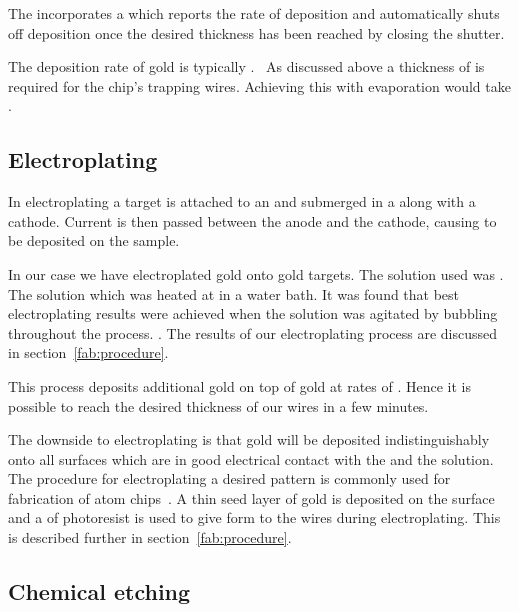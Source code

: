 The  incorporates a  which reports the rate of
deposition and automatically shuts off deposition once the desired thickness
has been reached by closing the shutter. 

The deposition rate of gold is typically .~\cite{} As discussed above 
a thickness of  is required for the chip's trapping wires. Achieving
this with evaporation would take . 

\subsection{Electroplating}

In electroplating a target is attached to an  and submerged in a
 along with a cathode. Current is then passed between
the anode and the cathode, causing  to be deposited on
the sample. 


In our case we have electroplated gold onto gold targets. The solution used was
. The solution which was heated at
 in a water bath. It was found that best electroplating results were
achieved when the solution was agitated by bubbling throughout the process.
.  The results of our electroplating
process are discussed in section~\ref{fab:procedure}.

This process deposits additional gold on top of gold at rates of . Hence it is possible to reach the desired thickness
of our wires in a few minutes.

The downside to electroplating is that gold will be deposited indistinguishably
onto all surfaces which are in good electrical contact with the  and
the solution. The procedure for electroplating a desired pattern is commonly
used for fabrication of atom chips~\cite{}. A thin seed layer of gold is
deposited on the surface and a  of photoresist is used to give form
to the wires during electroplating. This is described further in
section~\ref{fab:procedure}.

\subsection{Chemical etching}

